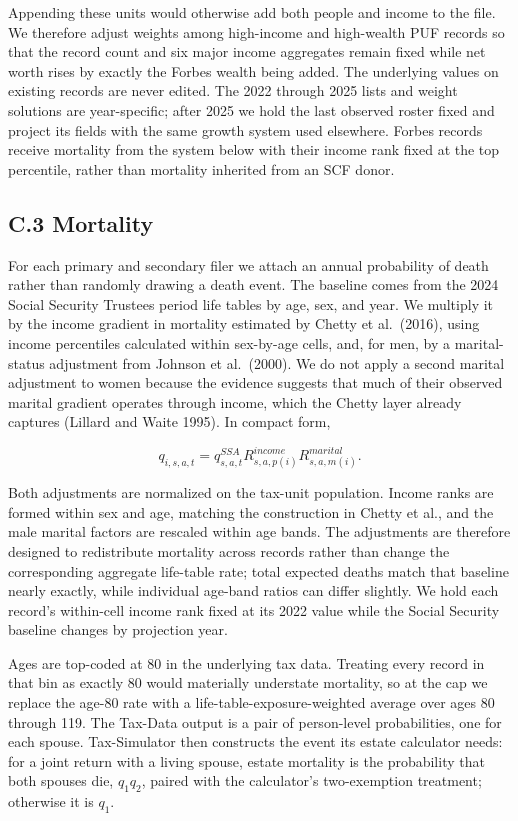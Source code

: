\documentclass[10pt,twocolumn]{article}
\begin{document}
Appending these units would otherwise add both people and income to the
file. We therefore adjust weights among high-income and high-wealth PUF
records so that the record count and six major income aggregates remain
fixed while net worth rises by exactly the Forbes wealth being added.
The underlying values on existing records are never edited. The 2022
through 2025 lists and weight solutions are year-specific; after 2025 we
hold the last observed roster fixed and project its fields with the same
growth system used elsewhere. Forbes records receive mortality from the
system below with their income rank fixed at the top percentile, rather than
mortality inherited from an SCF donor.

\subsection*{C.3 Mortality}

For each primary and secondary filer we attach an annual probability of
death rather than randomly drawing a death event. The baseline comes
from the 2024 Social Security Trustees period life tables by age, sex,
and year. We multiply it by the income gradient in mortality estimated
by Chetty et al.~(2016), using income percentiles calculated within
sex-by-age cells, and, for men, by a marital-status adjustment from
Johnson et al.~(2000). We do not apply a second marital adjustment to
women because the evidence suggests that much of their observed marital
gradient operates through income, which the Chetty layer already
captures (Lillard and Waite 1995). In compact form,

\[
q_{i,s,a,t}
= q^{SSA}_{s,a,t}
  R^{income}_{s,a,p(i)}
  R^{marital}_{s,a,m(i)}.
\]

Both adjustments are normalized on the tax-unit population. Income ranks
are formed within sex and age, matching the construction in Chetty et
al., and the male marital factors are rescaled within age bands. The adjustments are therefore designed to redistribute mortality across
records rather than change the corresponding aggregate life-table rate;
total expected deaths match that baseline nearly exactly, while
individual age-band ratios can differ slightly. We hold each record's
within-cell income rank fixed at its 2022 value while the Social
Security baseline changes by projection year.

Ages are top-coded at 80 in the underlying tax data. Treating every
record in that bin as exactly 80 would materially understate mortality,
so at the cap we replace the age-80 rate with a
life-table-exposure-weighted average over ages 80 through 119. The
Tax-Data output is a pair of person-level probabilities, one for each
spouse. Tax-Simulator then constructs the event its estate calculator
needs: for a joint return with a living spouse, estate mortality is the
probability that both spouses die, \(q_1q_2\), paired with the
calculator's two-exemption treatment; otherwise it is \(q_1\).
\end{document}
